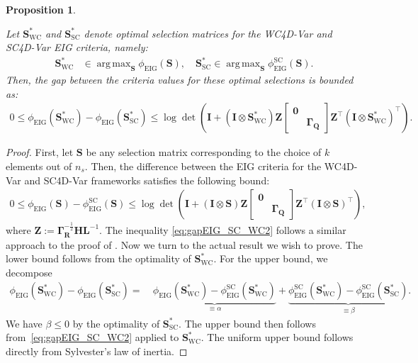 \documentclass[10pt,a4paper]{amsart}
\newtheorem{proposition}{Proposition}
\newcommand{\Gmeas}{\bm{\Gamma}_{\bm R}}
\newcommand{\Gq}{\bm \Gamma_{\bm Q}}
\newcommand{\I}{{\mathbf{I}}}
\renewcommand{\L}{\mathbf{L}}
\renewcommand{\O}{{\mathbf{H}}}
\renewcommand{\S}{{\mathbf{S}}}
\DeclareMathOperator*{\argmax}{arg\,max}
\newcommand{\criteria}{\phi_\text{EIG}}
\newcommand{\logdet}{{\log\!\det}}
\begin{document}
\begin{proposition}\label{proposition:SCandWCoptCriteriaGap}


Let \( \S^*_\text{WC} \) and \( \S^*_\text{SC} \) denote  optimal selection matrices for the WC4D-Var and SC4D-Var EIG criteria, namely:
\begin{align}
    \S^*_\text{WC} &\in \argmax_{\S} \criteria(\S), \quad
    \S^*_\text{SC} \in \argmax_{\S} \criteria^\text{SC}(\S).
\end{align}
Then, the gap between the criteria values for these optimal selections is bounded as:
\begin{align*}
    0\leq \criteria(\S^*_\text{WC}) - \criteria(\S^*_\text{SC}) \leq \logdet \left( \I + (\I \otimes \S^*_\text{WC})\bm{Z} 
    \begin{bmatrix}
    \bm{0} & \\
    & \Gq
    \end{bmatrix} 
    \bm{Z}^\top (\I \otimes \S^*_\text{WC})^\top \right).
\end{align*}

\end{proposition}

\begin{proof}
First, let \( \S \) be any selection matrix corresponding to the choice of \( k \) elements  out of \( n_s \). 
Then, the difference between the EIG criteria for the WC4D-Var and SC4D-Var frameworks satisfies the following bound:
\begin{align}\label{eq:gapEIG_SC_WC2}
    0 \leq \criteria(\S) - \criteria^\text{SC}(\S) \leq \logdet \left( \I + (\I \otimes \S)\bm{Z} 
    \begin{bmatrix}
    \bm{0} & \\
    & \Gq
    \end{bmatrix} 
    \bm{Z}^\top (\I \otimes \S)^\top \right),
\end{align}
where \( \bm{Z} := \Gmeas^{-\frac{1}{2}} \O \L^{-1} \).
The inequality \eqref{eq:gapEIG_SC_WC2} follows a similar approach to the proof of  . 
Now we turn to the actual result we wish to prove. The lower bound follows from the optimality of $\S^*_\text{WC}$.  For the upper bound, we decompose 
\[\begin{aligned}
    \criteria(\S^*_\text{WC}) - \criteria(\S^*_\text{SC}) = & \>  \underbrace{\criteria(\S^*_\text{WC}) - \criteria^\text{SC}(\S^*_\text{WC})}_{\equiv \alpha}
     + \underbrace{\criteria^\text{SC}(\S^*_\text{WC}) -  \criteria^\text{SC}(\S^*_\text{SC})}_{\equiv \beta}.
\end{aligned} \]
We have $\beta \le 0$ by  the optimality of $\S^*_\text{SC}$. The upper bound then follows from~\eqref{eq:gapEIG_SC_WC2} applied to $\S^*_\text{WC}$.
The uniform upper bound follows directly from Sylvester's law of inertia. 
\end{proof}
\end{document}
